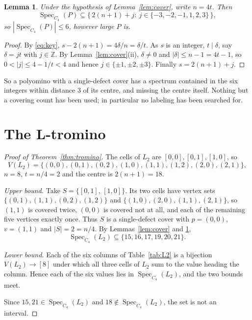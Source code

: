 \documentclass[11pt]{amsart}
\newtheorem{lemma}[theorem]{Lemma}
\DeclareMathOperator{\Spec}{Spec}
\begin{document}
\begin{lemma}\label{lem:window}
Under the hypothesis of Lemma~\ref{lem:cover}, write $n=4t$. Then
\[
  \Spec_{C_4}(P)\subseteq\bigl\{\,2(n+1)+j:\ j\in\{-3,-2,-1,1,2,3\}\,\bigr\},
\]
so $|\Spec_{C_4}(P)|\le6$, however large $P$ is.
\end{lemma}

\begin{proof}
By \eqref{eq:key}, $s-2(n+1)=4\delta/n=\delta/t$. As $s$ is an integer,
$t\mid\delta$, say $\delta=jt$ with $j\in\mathbb Z$. By
Lemma~\ref{lem:cover}(ii), $\delta\ne0$ and $|\delta|\le n-1=4t-1$, so
$0<|j|\le4-1/t<4$ and hence $j\in\{\pm1,\pm2,\pm3\}$. Finally
$s=2(n+1)+j$.
\end{proof}

So a polyomino with a single-defect cover has a spectrum contained in the six
integers within distance $3$ of its centre, and missing the centre itself.
Nothing but a covering count has been used; in particular no labeling has been
searched for.

\section{The L-tromino}\label{sec:tromino}

\begin{proof}[Proof of Theorem~\ref{thm:tromino}]
The cells of $L_2$ are $[0,0],[0,1],[1,0]$, so
\[
  V(L_2)=\{(0,0),(0,1),(0,2),(1,0),(1,1),(1,2),(2,0),(2,1)\},
\]
$n=8$, $t=n/4=2$ and the centre is $2(n+1)=18$.

\emph{Upper bound.} Take $S=\{[0,1],\,[1,0]\}$. Its two cells have vertex sets
$\{(0,1),(1,1),(0,2),(1,2)\}$ and $\{(1,0),(2,0),(1,1),(2,1)\}$, so $(1,1)$ is
covered twice, $(0,0)$ is covered not at all, and each of the remaining five
vertices exactly once. Thus $S$ is a single-defect cover with $p=(0,0)$,
$v=(1,1)$ and $|S|=2=n/4$. By Lemmas~\ref{lem:cover} and \ref{lem:window},
\[
  \Spec_{C_4}(L_2)\subseteq\{15,16,17,19,20,21\}.
\]

\emph{Lower bound.} Each of the six columns of Table~\ref{tab:L2} is a
bijection $V(L_2)\to[8]$ under which all three cells of $L_2$ sum to the
value heading the column. Hence each of the six values lies in
$\Spec_{C_4}(L_2)$, and the two bounds meet.

Since $15,21\in\Spec_{C_4}(L_2)$ and $18\notin\Spec_{C_4}(L_2)$, the set is
not an interval.
\end{proof}
\end{document}
